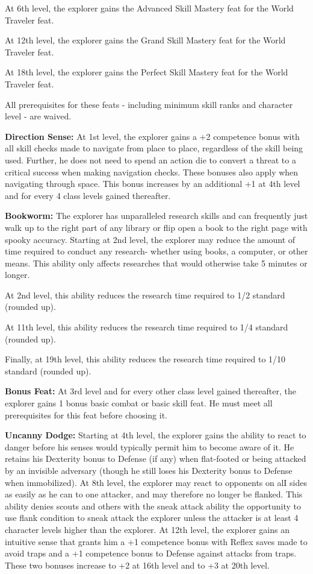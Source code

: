 At 6th level, the explorer gains the Advanced Skill Mastery feat for the World Traveler feat.

At 12th level, the explorer gains the Grand Skill Mastery feat for the World Traveler feat.

At 18th level, the explorer gains the Perfect Skill Mastery feat for the World Traveler feat.

All prerequisites for these feats - including minimum skill ranks and character level - are waived.

\textbf{Direction Sense:} At 1st level, the explorer gains a +2 competence bonus with all skill checks made to navigate from place to place, regardless of the skill being used. Further, he does not need to spend an action die to convert a threat to a critical success when making navigation checks. These bonuses also apply when navigating through space. This bonus increases by an additional +1 at 4th level and for every 4 class levels gained thereafter.

\textbf{Bookworm:} The explorer has unparalleled research skills and can frequently just walk up to the right part of any library or flip open a book to the right page with spooky accuracy. Starting at 2nd level, the explorer may reduce the amount of time required to conduct any research- whether using books, a computer, or other means. This ability only affects researches that would otherwise take 5 minutes or longer.

At 2nd level, this ability reduces the research time required to 1/2 standard (rounded up).

At 11th level, this ability reduces the research time required to 1/4 standard (rounded up).

Finally, at 19th level, this ability reduces the research time required to 1/10 standard (rounded up).

\textbf{Bonus Feat:} At 3rd level and for every other class level gained thereafter, the explorer gains 1 bonus basic combat or basic skill feat. He must meet all prerequisites for this feat before choosing it.

\textbf{Uncanny Dodge:} Starting at 4th level, the explorer gains the ability to react to danger before his senses would typically permit him to become aware of it. He retains his Dexterity bonus to Defense (if any) when flat-footed or being attacked by an invisible adversary (though he still loses his Dexterity bonus to Defense when immobilized).
At 8th level, the explorer may react to opponents on alI sides as easily as he can to one attacker, and may therefore no longer be flanked. This ability denies scouts and others with the sneak attack ability the opportunity to use flank condition to sneak attack the explorer unless the attacker is at least 4 character levels higher than the explorer.
At 12th level, the explorer gains an intuitive sense that grants him a +1 competence bonus with Reflex saves made to avoid traps and a +1 competence bonus to Defense against attacks from traps. These two bonuses increase to +2 at 16th level and to +3 at 20th level.

